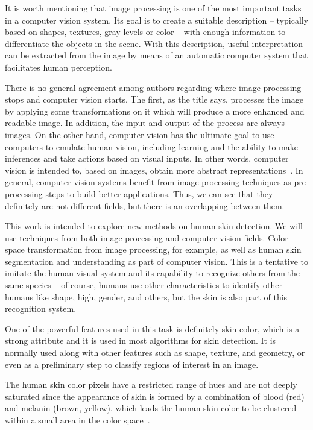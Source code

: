 It is worth mentioning that image processing is one of the most important tasks in a computer vision system. Its goal is to create a suitable description -- typically based on shapes, textures, gray levels or color -- with enough information to differentiate the objects in the scene. With this description, useful interpretation can be extracted from the image by means of an automatic computer system that facilitates human perception.

There is no general agreement among authors regarding where image processing stops and computer vision starts. The first, as the title says, processes the image by applying some transformations on it which will produce a more enhanced and readable image. In addition, the input and output of the process are always images. On the other hand, computer vision has the ultimate goal to use computers to emulate human vision, including learning and the ability to make inferences and take actions based on visual inputs. In other words, computer vision is intended to, based on images, obtain more abstract representations~\citep{gonzalez:02}. In general,
computer vision systems benefit from image processing techniques as pre-processing steps to build better applications. Thus, we can see that they definitely are not different fields, but there is an overlapping between them.

This work is intended to explore new methods on human skin detection. We will use techniques from both image processing and computer vision fields. Color space transformation from image processing, for example, as well as human skin segmentation and understanding as part of computer vision. This is a tentative to imitate the human visual system and its capability to recognize others from the same species -- of course, humans use other characteristics to identify other humans like shape, high, gender, and others, but the skin is also part of this recognition system.

One of the powerful features used in this task is definitely skin color, which is a strong attribute and it is used in most algorithms for skin detection. It is normally used along with other features such as shape, texture, and geometry, or even as a preliminary step to classify regions of interest in an image.

The human skin color pixels have a restricted range of hues and are not deeply saturated since the appearance of skin is formed by a combination of blood (red) and melanin (brown, yellow), which leads the human skin color to be clustered within a small area in the color space~\citep{fleck:96}.

